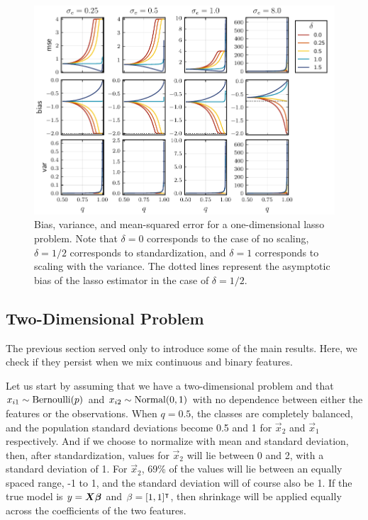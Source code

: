 \begin{figure}[htpb]
  \centering
  \includegraphics[]{plots/bias-var-onedim.pdf}
  \caption{%
    Bias, variance, and mean-squared error for a one-dimensional lasso problem.
    Note that \(\delta = 0\) corresponds to the case of no scaling, \(\delta = 1/2\) corresponds
    to standardization, and \(\delta = 1\) corresponds to scaling with the variance. The dotted
    lines represent the asymptotic bias of the lasso estimator in the case of \(\delta = 1/2\).
  }
  \label{fig:bias-var-onedim-lasso}
\end{figure}

\subsection{Two-Dimensional Problem}

The previous section served only to introduce some of the main results. Here, we check if they persist when we mix continuous and binary features.

Let us start by assuming that we have a two-dimensional problem and that \(x_{i1} \sim \operatorname{Bernoulli}(p)\) and \(x_{i2} \sim \operatorname{Normal}(0, 1)\) with no dependence between either the features or the observations. When \(q = 0.5\), the classes are completely balanced, and the population standard deviations become 0.5 and 1 for \(\vec{x}_2\) and \(\vec{x}_1\) respectively. And if we choose to normalize with mean and standard deviation, then, after standardization, values for \(\vec{x}_2\) will lie between 0 and 2, with a standard deviation of 1. For \(\vec{x}_2\), 69\% of the values will lie between an equally spaced range, -1 to 1, and the standard deviation will of course also be 1. If the true model is \(y = \boldsymbol{X}\boldsymbol{\beta}\) and \(\beta = [1,1]^\intercal\), then shrinkage will be applied equally across the coefficients of the two features.

